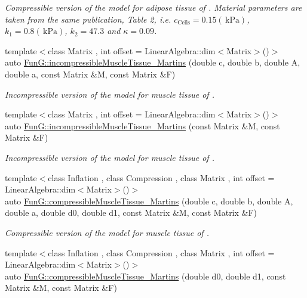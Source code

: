 \begin{DoxyCompactItemize}
\begin{DoxyCompactList}\small\item\em Compressible version of the model for adipose tissue of \cite{Sommer2013}. Material parameters are taken from the same publication, Table 2, i.\-e. $c_\mathrm{Cells}=0.15 (\,\mathrm{kPa})$, $k_1=0.8 (\,\mathrm{kPa})$, $k_2=47.3$ and $\kappa=0.09$. \end{DoxyCompactList}\item 
{\footnotesize template$<$class Matrix , int offset = Linear\-Algebra\-::dim$<$\-Matrix$>$()$>$ }\\auto \hyperlink{group__Biomechanics_gafcc36a1958899ca9246c4c1b3c9bfd85}{Fun\-G\-::incompressible\-Muscle\-Tissue\-\_\-\-Martins} (double c, double b, double A, double a, const Matrix \&M, const Matrix \&F)
\begin{DoxyCompactList}\small\item\em Incompressible version of the model for muscle tissue of \cite{Martins1998}. \end{DoxyCompactList}\item 
{\footnotesize template$<$class Matrix , int offset = Linear\-Algebra\-::dim$<$\-Matrix$>$()$>$ }\\auto \hyperlink{group__Biomechanics_ga9e414585a90b1988e9fa88d17d875055}{Fun\-G\-::incompressible\-Muscle\-Tissue\-\_\-\-Martins} (const Matrix \&M, const Matrix \&F)
\begin{DoxyCompactList}\small\item\em Incompressible version of the model for muscle tissue of \cite{Martins1998}. \end{DoxyCompactList}\item 
{\footnotesize template$<$class Inflation , class Compression , class Matrix , int offset = Linear\-Algebra\-::dim$<$\-Matrix$>$()$>$ }\\auto \hyperlink{group__Biomechanics_gad831914c493a3da04ed40c3c0ce87a62}{Fun\-G\-::compressible\-Muscle\-Tissue\-\_\-\-Martins} (double c, double b, double A, double a, double d0, double d1, const Matrix \&M, const Matrix \&F)
\begin{DoxyCompactList}\small\item\em Compressible version of the model for muscle tissue of \cite{Martins1998}. \end{DoxyCompactList}\item 
{\footnotesize template$<$class Inflation , class Compression , class Matrix , int offset = Linear\-Algebra\-::dim$<$\-Matrix$>$()$>$ }\\auto \hyperlink{group__Biomechanics_ga46a70ccb2285e12addad87b6a8aaaae8}{Fun\-G\-::compressible\-Muscle\-Tissue\-\_\-\-Martins} (double d0, double d1, const Matrix \&M, const Matrix \&F)

\end{DoxyCompactItemize}
